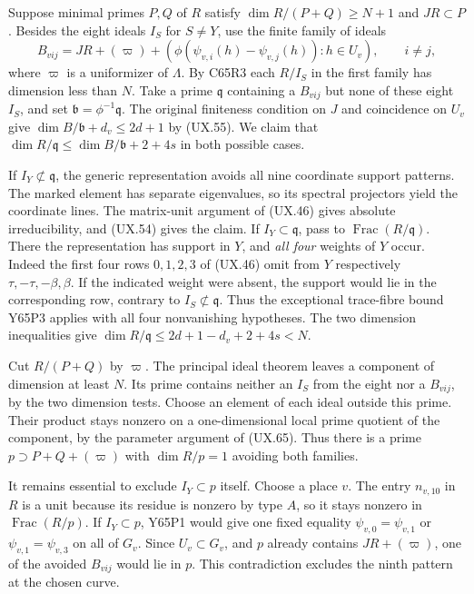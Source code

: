 Suppose minimal primes $P,Q$ of $R$ satisfy
$\dim R/(P+Q)\ge N+1$ and $J R\subset P$. Besides the eight
ideals $I_S$ for $S\ne Y$, use the finite family of ideals
\[
    B_{vij}=J R+(\varpi)+
        (\phi(\psi_{v,i}(h)-\psi_{v,j}(h)):h\in U_v),
           \qquad i\ne j ,
\]
where $\varpi$ is a uniformizer of $\Lambda$. By C65R3 each
$R/I_S$ in the first family has dimension less than $N$.
Take a prime $\mathfrak q$ containing a $B_{vij}$ but none of
these eight $I_S$, and set $\mathfrak b=\phi^{-1}\mathfrak q$.
The original finiteness condition on $J$ and coincidence on $U_v$
give $\dim B/\mathfrak b+d_v\le2d+1$ by (UX.55).
We claim that $\dim R/\mathfrak q\le\dim B/\mathfrak b+2+4s$
in both possible cases.

If $I_Y\not\subset\mathfrak q$, the generic representation avoids
all nine coordinate support patterns. The marked element has separate
eigenvalues, so its spectral projectors yield the coordinate lines.
The matrix-unit argument of (UX.46) gives absolute irreducibility,
and (UX.54) gives the claim. If $I_Y\subset\mathfrak q$, pass to
$\operatorname{Frac}(R/\mathfrak q)$. There the representation has
support in $Y$, and \emph{all four} weights of $Y$ occur. Indeed the
first four rows $0,1,2,3$ of (UX.46) omit from $Y$ respectively
$\tau,-\tau,-\beta,\beta$. If the indicated weight were absent,
the support would lie in the corresponding row, contrary to
$I_S\not\subset\mathfrak q$. Thus the exceptional trace-fibre
bound Y65P3 applies with all four nonvanishing hypotheses.
The two dimension inequalities give
$\dim R/\mathfrak q\le2d+1-d_v+2+4s<N$.

Cut $R/(P+Q)$ by $\varpi$. The principal ideal theorem leaves a
component of dimension at least $N$. Its prime contains neither an
$I_S$ from the eight nor a $B_{vij}$, by the two dimension tests.
Choose an element of each ideal outside this prime. Their product
stays nonzero on a one-dimensional local prime quotient of the
component, by the parameter argument of (UX.65). Thus there is a
prime $p\supset P+Q+(\varpi)$ with $\dim R/p=1$ avoiding both
families.

It remains essential to exclude $I_Y\subset p$ itself. Choose a
place $v$. The entry $n_{v,10}$ in $R$ is a unit because its residue
is nonzero by type $A$, so it stays nonzero in
$\operatorname{Frac}(R/p)$. If $I_Y\subset p$, Y65P1 would give
one fixed equality $\psi_{v,0}=\psi_{v,1}$ or
$\psi_{v,1}=\psi_{v,3}$ on all of $G_v$. Since $U_v\subset G_v$,
and $p$ already contains $JR+(\varpi)$, one of the avoided
$B_{vij}$ would lie in $p$. This contradiction excludes the ninth
pattern at the chosen curve.

